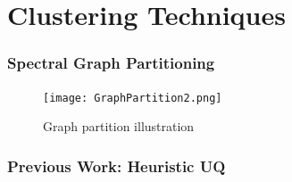 \documentclass[9pt]{beamer}
\begin{document}
\section{Clustering Techniques}
\label{sec-2}
\begin{frame}
\frametitle{Spectral Graph Partitioning}
\label{sec-2-1}

\vspace*{-0.0cm}\begin{figure}
    \texttt{[image: GraphPartition2.png]}
    \caption{Graph partition illustration}
\end{figure}


 
\end{frame}
\begin{frame}
\frametitle{Previous Work: Heuristic UQ}
\label{sec-2-2}



\end{frame}
\end{document}

